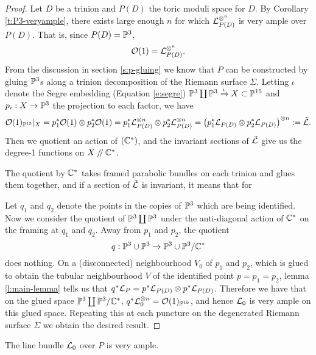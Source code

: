 \begin{proof}
	Let $D$ be a trinion and $P(D)$ the toric moduli space for $D$. By Corollary \ref{t:P3-veryample}, there exists large enough $n$ for which $\mathcal{L}_{P(D)}^{\otimes^n}$ is very ample over $P(D)$. That is, since $P(D) = \mathbb{P}^3$,
	\begin{equation}
	\mathcal{O}(1) = \mathcal{L}_{P(D)}^{\otimes^n}.
	\end{equation}
	From the discussion in section \ref{s:p-gluing} we know that $P$ can be constructed by gluing $\mathbb{P}^3$s along a trinion decomposition of the Riemann surface $\Sigma$. Letting $\iota$ denote the Segre embedding (Equation \ref{e:segre}) $\mathbb{P}^3 \coprod \mathbb{P}^3 \xrightarrow{\iota} X\subset \mathbb{P}^{15}$ and $p_i:X\to \mathbb{P}^3$ the projection to each factor, we have
	\begin{equation}
	\mathcal{O}(1)_{\mathbb{P}^{15}}|_X = p_1^\ast \mathcal{O}(1)\otimes p_2^\ast \mathcal{O}(1) = p_1^\ast \mathcal{L}_{P(D)}^{\otimes n}\otimes p_2^\ast \mathcal{L}_{P(D)}^{\otimes n} = \left(p_1^\ast \mathcal{L}_{P(D)}\otimes p_2^\ast \mathcal{L}_{P(D)}\right)^{\otimes n} := \tilde{\mathcal{L}}.
	\end{equation}
	Then we quotient an action of $(\mathbb{C}^\ast)$, and the invariant sections of $\tilde{\mathcal{L}}$ give us the degree-1 functions on $X\mathbin{/\mkern-4mu/}\mathbb{C}^\ast$. 
	
	The quotient by $\mathbb{C}^\ast$ takes framed parabolic bundles on each trinion and glues them together, and if a section of $\tilde{\mathcal{L}}$ is invariant, it means that for 
	
	
	Let $q_1$ and $q_2$ denote the points in the copies of $\mathbb{P}^3$ which are being identified. Now we consider the quotient of $\mathbb{P}^3 \coprod \mathbb{P}^3$ under the anti-diagonal action of $\mathbb{C}^\ast$ on the framing at $q_1$ and $q_2$. Away from $p_1$ and $p_2$, the quotient
	\begin{equation}
	q: \mathbb{P}^3 \cup \mathbb{P}^3 \to \mathbb{P}^3 \cup \mathbb{P}^3 / \mathbb{C}^\ast
	\end{equation}
	does nothing. On a (disconnected) neighbourhood $V_0$ of $p_1$ and $p_2$, which is glued to obtain the tubular neighbourhood $V$ of the identified point $p=p_1=p_2$, lemma \ref{l:main-lemma} tells us that $q^\ast \mathcal{L}_{P} = p^\ast \mathcal{L}_{P(D)}\otimes p^\ast \mathcal{L}_{P(D)}$. Therefore we have that on the glued space $\mathbb{P}^3\coprod \mathbb{P}^3 / \mathbb{C}^\ast$, $q^\ast \mathcal{L}_0^{\otimes n} = \mathcal{O}(1)_{\mathbb{P}^{15}}$, and hence $\mathcal{L}_0$ is very ample on this glued space. Repeating this at each puncture on the degenerated Riemann surface $\Sigma$ we obtain the desired result.
\end{proof}
\begin{corollary}
	The line bundle $\mathcal{L}_0$ over $P$ is very ample.
\end{corollary}
